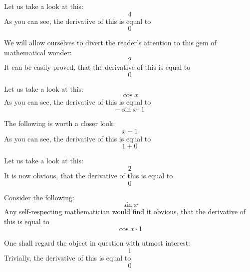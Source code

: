 \documentclass{article}
\begin{document}
Let us take a look at this:
\begin{equation}
4 
\end{equation}
As you can see, the derivative of this is equal to
\begin{equation}
0 
\end{equation}

We will allow ourselves to divert the reader's attention to this gem of mathematical wonder:
\begin{equation}
2 
\end{equation}
It can be easily proved, that the derivative of this is equal to
\begin{equation}
0 
\end{equation}

Let us take a look at this:
\begin{equation}
\cos x 
\end{equation}
As you can see, the derivative of this is equal to
\begin{equation}
-\sin x \cdot 1 
\end{equation}

The following is worth a closer look:
\begin{equation}
x + 1 
\end{equation}
As you can see, the derivative of this is equal to
\begin{equation}
1 + 0 
\end{equation}

Let us take a look at this:
\begin{equation}
2 
\end{equation}
It is now obvious, that the derivative of this is equal to
\begin{equation}
0 
\end{equation}

Consider the following:
\begin{equation}
\sin x 
\end{equation}
Any self-respecting mathematician would find it obvious, that the derivative of this is equal to
\begin{equation}
\cos x \cdot 1 
\end{equation}

One shall regard the object in question with utmost interest:
\begin{equation}
1 
\end{equation}
Trivially, the derivative of this is equal to
\begin{equation}
0 
\end{equation}
\end{document}
